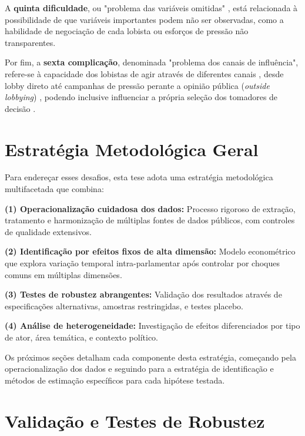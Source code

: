 A \textbf{quinta dificuldade}, ou "problema das variáveis omitidas" \cite{de_figueiredo_advancing_2014}, está relacionada à possibilidade de que variáveis importantes podem não ser observadas, como a habilidade de negociação de cada lobista ou esforços de pressão não transparentes.

Por fim, a \textbf{sexta complicação}, denominada "problema dos canais de influência", refere-se à capacidade dos lobistas de agir através de diferentes canais \cite{dur_measuring_2008}, desde lobby direto até campanhas de pressão perante a opinião pública (\textit{outside lobbying}) \cite{kollman1998outside}, podendo inclusive influenciar a própria seleção dos tomadores de decisão \cite{fordham2003selection}.

\section{Estratégia Metodológica Geral}

Para endereçar esses desafios, esta tese adota uma estratégia metodológica multifacetada que combina:

\textbf{(1) Operacionalização cuidadosa dos dados:} Processo rigoroso de extração, tratamento e harmonização de múltiplas fontes de dados públicos, com controles de qualidade extensivos.

\textbf{(2) Identificação por efeitos fixos de alta dimensão:} Modelo econométrico que explora variação temporal intra-parlamentar após controlar por choques comuns em múltiplas dimensões.

\textbf{(3) Testes de robustez abrangentes:} Validação dos resultados através de especificações alternativas, amostras restringidas, e testes placebo.

\textbf{(4) Análise de heterogeneidade:} Investigação de efeitos diferenciados por tipo de ator, área temática, e contexto político.

Os próximos seções detalham cada componente desta estratégia, começando pela operacionalização dos dados e seguindo para a estratégia de identificação e métodos de estimação específicos para cada hipótese testada.







\section{Validação e Testes de Robustez}


